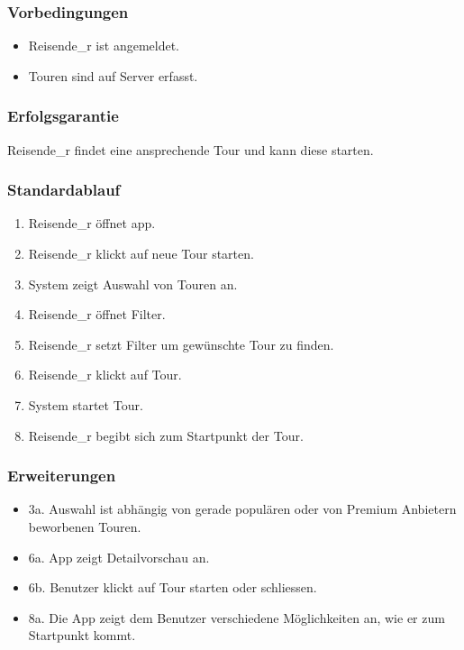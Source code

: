 \documentclass[a4paper,10pt,xetex]{article}
\begin{document}
\subsubsection{Vorbedingungen}\label{vorbedingungen}
\begin{itemize}
  \item Reisende_r ist angemeldet.
  \item Touren sind auf Server erfasst.
\end{itemize}


\subsubsection{Erfolgsgarantie}\label{erfolgsgarantie}
Reisende_r findet eine ansprechende Tour und kann diese starten.


\subsubsection{Standardablauf}\label{standardablauf}
\begin{enumerate}
  \item Reisende_r öffnet app.
  \item Reisende_r klickt auf neue Tour starten.
  \item System zeigt Auswahl von Touren an.
  \item Reisende_r öffnet Filter.
  \item Reisende_r setzt Filter um gewünschte Tour zu finden.
  \item Reisende_r klickt auf Tour.
  \item System startet Tour.
  \item Reisende_r begibt sich zum Startpunkt der Tour.
\end{enumerate}


\subsubsection{Erweiterungen}\label{erweiterungen}
\begin{itemize}
  \item 3a. Auswahl ist abhängig von gerade populären oder von Premium Anbietern beworbenen Touren.
  \item 6a. App zeigt Detailvorschau an.
  \item 6b. Benutzer klickt auf Tour starten oder schliessen.
  \item 8a. Die App zeigt dem Benutzer verschiedene Möglichkeiten an, wie er zum Startpunkt kommt.
\end{itemize}
\end{document}
